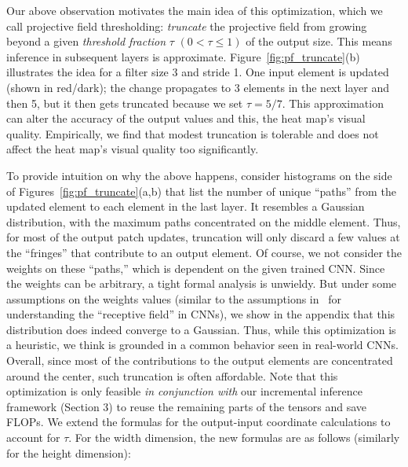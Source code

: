 Our above observation motivates the main idea of this optimization, which we call projective field thresholding: \textit{truncate} the projective field from growing beyond a given \textit{threshold fraction} $\tau$ $(0 < \tau \leq 1)$ of the output size. This means inference in subsequent layers is approximate. Figure~\ref{fig:pf_truncate}(b) illustrates the idea for a filter size 3 and stride 1. One input element is updated (shown in red/dark); the change propagates to 3 elements in the next layer and then 5, but it then gets truncated because we set $\tau = 5/7$. This approximation can alter the accuracy of the output values and this, the heat map's visual quality. Empirically, we find that modest truncation is tolerable and does not affect the heat map's visual quality too significantly. 

To provide intuition on why the above happens, consider histograms on the side of Figures~\ref{fig:pf_truncate}(a,b) that list the number of unique ``paths'' from the updated element to each element in the last layer. It resembles a Gaussian distribution, with the maximum paths concentrated on the middle element. Thus, for most of the output patch updates, truncation will only discard a few values at the ``fringes'' that contribute to an output element. Of course, we not consider the weights on these ``paths,'' which is dependent on the given trained CNN. Since the weights can be arbitrary, a tight formal analysis is unwieldy. But under some assumptions on the weights values (similar to the assumptions in~\cite{luo2016understanding} for understanding the ``receptive field'' in CNNs), we show in the appendix that this distribution does indeed converge to a Gaussian. Thus, while this optimization is a heuristic, we think is grounded in a common behavior seen in real-world CNNs.
Overall, since most of the contributions to the output elements are concentrated around the center, such truncation is often affordable. Note that this optimization is only feasible \textit{in conjunction with} our incremental inference framework (Section 3) to reuse the remaining parts of the tensors and save FLOPs.
We extend the formulas for the output-input coordinate calculations to account for $\tau$. For the width dimension,  the new formulas are as follows (similarly for the height dimension):

